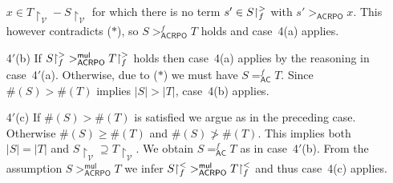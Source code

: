 \documentclass{tlp}
\newcommand{\qed}{\hspace*{1em}\hbox{\proofbox}}
\newcommand{\m}[1]{\mathsf{#1}}
\newcommand{\mc}[1]{\mathcal{#1}}
\newcommand{\mr}[1]{\mathrm{#1}}
\newcommand{\mul}{\m{mul}}
\newcommand{\VV}{\mc{V}}
\newcommand{\AC}{\mr{\m{AC}}}
\newcommand{\acrpo}{\mr{\m{ACRPO}}}
\newcommand{\rrs}[3][f]{{#2}{\restriction}^{\smash{#3}}_{#1}}
\begin{document}
\begin{proof*}
\begin{enumerate}
$x \in T{\restriction}_\VV - S{\restriction}_\VV$ for which there is no
term $s' \in \rrs{S}{>}$ with $s' >_\acrpo x$. This however contradicts
($\ast$), so $S >_\acrpo^f T$ holds and case~4(a)
applies.
\smallskip
\item[4$'$(b)]
If $\rrs{S}{>} >_\acrpo^\mul \rrs{T}{>}$ holds then case~4(a)
applies by
the reasoning in case~4$'$(a).
Otherwise, due to ($\ast$) we must have 
$S =_\AC^f T$. Since $\#(S) > \#(T)$ implies $|S| > |T|$, case~4(b)
applies.
\smallskip
\item[4$'$(c)]
If $\#(S) > \#(T)$ is satisfied we argue as in the preceding case.
Otherwise $\#(S) \geqslant \#(T)$ and $\#(S) \ngtr \#(T)$. This implies
both $|S| = |T|$ and $S{\restriction}_\VV \supseteq T{\restriction}_\VV$.
We obtain $S =_\AC^f T$ as in case~4$'$(b).
From the assumption $S >_\acrpo^\mul T$ we infer
$\rrs{S}{<} >_\acrpo^\mul \rrs{T}{<}$ and thus case~4(c)
applies.
\qed
\end{enumerate}
\end{proof*}
\fi
\end{document}

